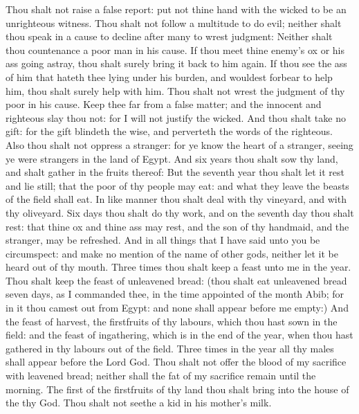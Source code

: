 \begin{biblechapter} %
 Thou shalt not raise a false report: put not thine hand with the wicked to be an unrighteous witness.
\verse Thou shalt not follow a multitude to do evil; neither shalt thou speak in a cause to decline after many to wrest judgment:
\verse Neither shalt thou countenance a poor man in his cause.
\verse If thou meet thine enemy's ox or his ass going astray, thou shalt surely bring it back to him again.
\verse If thou see the ass of him that hateth thee lying under his burden, and wouldest forbear to help him, thou shalt surely help with him.
\verse Thou shalt not wrest the judgment of thy poor in his cause.
\verse Keep thee far from a false matter; and the innocent and righteous slay thou not: for I will not justify the wicked.
\verse And thou shalt take no gift: for the gift blindeth the wise, and perverteth the words of the righteous.
\verse Also thou shalt not oppress a stranger: for ye know the heart of a stranger, seeing ye were strangers in the land of Egypt.
\columnbreak %
 And six years thou shalt sow thy land, and shalt gather in the fruits thereof:
\verse But the seventh year thou shalt let it rest and lie still; that the poor of thy people may eat: and what they leave the beasts of the field shall eat. In like manner thou shalt deal with thy vineyard, and with thy oliveyard.
\verse Six days thou shalt do thy work, and on the seventh day thou shalt rest: that thine ox and thine ass may rest, and the son of thy handmaid, and the stranger, may be refreshed.
\verse And in all things that I have said unto you be circumspect: and make no mention of the name of other gods, neither let it be heard out of thy mouth.
 Three times thou shalt keep a feast unto me in the year.
\verse Thou shalt keep the feast of unleavened bread: (thou shalt eat unleavened bread seven days, as I commanded thee, in the time appointed of the month Abib; for in it thou camest out from Egypt: and none shall appear before me empty:)
\verse And the feast of harvest, the firstfruits of thy labours, which thou hast sown in the field: and the feast of ingathering, which is in the end of the year, when thou hast gathered in thy labours out of the field.
\verse Three times in the year all thy males shall appear before the Lord God.
\verse Thou shalt not offer the blood of my sacrifice with leavened bread; neither shall the fat of my sacrifice remain until the morning.
\verse The first of the firstfruits of thy land thou shalt bring into the house of the \LORD thy God. Thou shalt not seethe a kid in his mother's milk.

\end{biblechapter}
